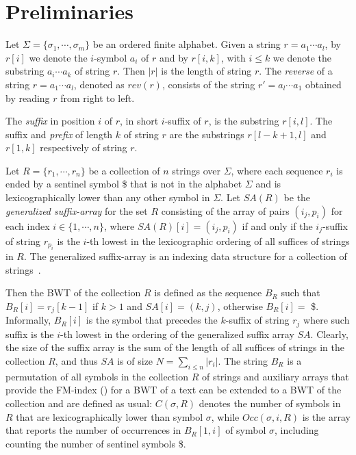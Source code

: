 \documentclass[runningheads,envcountsame,a4paper]{llncs}
\begin{document}
\section{Preliminaries}
Let $\Sigma = \{\sigma_1, \cdots, \sigma_m\}$ be an ordered finite
alphabet.
Given a string $r = a_1 \cdots a_l$, by $r[i]$ we denote the $i$-symbol
$a_i$ of $r$ and by $r[i,k]$, with $i \leq k$ we denote the substring
$a_i \cdots a_k$ of string $r$.
Then $|r|$ is the length of string $r$.
The \emph{reverse} of a string $r = a_1 \cdots a_l$, denoted as $rev(r)$,
consists of the string $r' = a_l \cdots a_1$ obtained by reading $r$
from right to left.

The \emph{suffix} in position $i$ of $r$, in short $i$-suffix of $r$, is
the substring $r[i, l]$.
The suffix and \emph{prefix} of length $k$ of string $r$ are the
substrings $r[l-k +1, l]$ and $r[1, k]$ respectively of string $r$.

Let $R = \{r_1, \cdots, r_n\}$ be a collection of $n$ strings over
$\Sigma$, where each sequence $r_i$ is ended by a sentinel symbol \$
that is not in the alphabet $\Sigma$ and is lexicographically lower than
any other symbol in $\Sigma$.
Let $SA(R)$ be the \emph{generalized suffix-array} for the set $R$
consisting of the array of pairs $(i_j, p_i)$ for each index $i \in \{1,
\cdots, n \}$, where $SA(R)[i]= (i_j, p_i)$ if and only if the
$i_j$-suffix of string $r_{p_i}$ is the $i$-th lowest in the
lexicographic ordering of all suffices of strings in $R$.
The generalized suffix-array is an indexing data structure for a
collection of strings~\cite{Shi1996}.

Then the BWT of the collection $R$ is defined as the sequence $B_R$ such
that $B_R[i]=r_{j}[k -1]$ if $k > 1$ and $SA[i] = (k,j)$, otherwise
$B_R[i]= $ \$.
Informally, $B_R[i]$ is the symbol that precedes the $k$-suffix of
string $r_j$ where such suffix is the $i$-th lowest in the ordering of
the generalized suffix array $SA$.
Clearly, the size of the suffix array is the sum of the length of all
suffices of strings in the collection $R$, and thus $SA$ is of size $N =
\sum_{i \leq n}|r_i|$.
The string $B_R$ is a permutation of all symbols in the collection $R$
of strings and auxiliary arrays that provide the FM-index
(\cite{Ferragina2000}) for a BWT of a text can be extended to a BWT of
the collection and are defined as usual: $C(\sigma, R)$ denotes the
number of symbols in $R$ that are lexicographically lower than symbol
$\sigma$, while $Occ(\sigma, i, R)$ is the array that reports the number
of occurrences in $B_R[1, i]$ of symbol $\sigma$, including counting the
number of sentinel symbols \$.
\end{document}
